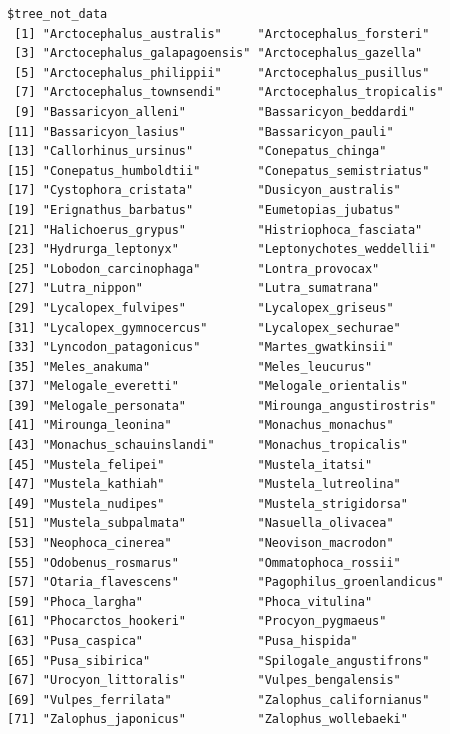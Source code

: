 \documentclass[
]{book}
\begin{document}
\begin{verbatim}
$tree_not_data
 [1] "Arctocephalus_australis"     "Arctocephalus_forsteri"     
 [3] "Arctocephalus_galapagoensis" "Arctocephalus_gazella"      
 [5] "Arctocephalus_philippii"     "Arctocephalus_pusillus"     
 [7] "Arctocephalus_townsendi"     "Arctocephalus_tropicalis"   
 [9] "Bassaricyon_alleni"          "Bassaricyon_beddardi"       
[11] "Bassaricyon_lasius"          "Bassaricyon_pauli"          
[13] "Callorhinus_ursinus"         "Conepatus_chinga"           
[15] "Conepatus_humboldtii"        "Conepatus_semistriatus"     
[17] "Cystophora_cristata"         "Dusicyon_australis"         
[19] "Erignathus_barbatus"         "Eumetopias_jubatus"         
[21] "Halichoerus_grypus"          "Histriophoca_fasciata"      
[23] "Hydrurga_leptonyx"           "Leptonychotes_weddellii"    
[25] "Lobodon_carcinophaga"        "Lontra_provocax"            
[27] "Lutra_nippon"                "Lutra_sumatrana"            
[29] "Lycalopex_fulvipes"          "Lycalopex_griseus"          
[31] "Lycalopex_gymnocercus"       "Lycalopex_sechurae"         
[33] "Lyncodon_patagonicus"        "Martes_gwatkinsii"          
[35] "Meles_anakuma"               "Meles_leucurus"             
[37] "Melogale_everetti"           "Melogale_orientalis"        
[39] "Melogale_personata"          "Mirounga_angustirostris"    
[41] "Mirounga_leonina"            "Monachus_monachus"          
[43] "Monachus_schauinslandi"      "Monachus_tropicalis"        
[45] "Mustela_felipei"             "Mustela_itatsi"             
[47] "Mustela_kathiah"             "Mustela_lutreolina"         
[49] "Mustela_nudipes"             "Mustela_strigidorsa"        
[51] "Mustela_subpalmata"          "Nasuella_olivacea"          
[53] "Neophoca_cinerea"            "Neovison_macrodon"          
[55] "Odobenus_rosmarus"           "Ommatophoca_rossii"         
[57] "Otaria_flavescens"           "Pagophilus_groenlandicus"   
[59] "Phoca_largha"                "Phoca_vitulina"             
[61] "Phocarctos_hookeri"          "Procyon_pygmaeus"           
[63] "Pusa_caspica"                "Pusa_hispida"               
[65] "Pusa_sibirica"               "Spilogale_angustifrons"     
[67] "Urocyon_littoralis"          "Vulpes_bengalensis"         
[69] "Vulpes_ferrilata"            "Zalophus_californianus"     
[71] "Zalophus_japonicus"          "Zalophus_wollebaeki"        


\end{verbatim}
\end{document}
